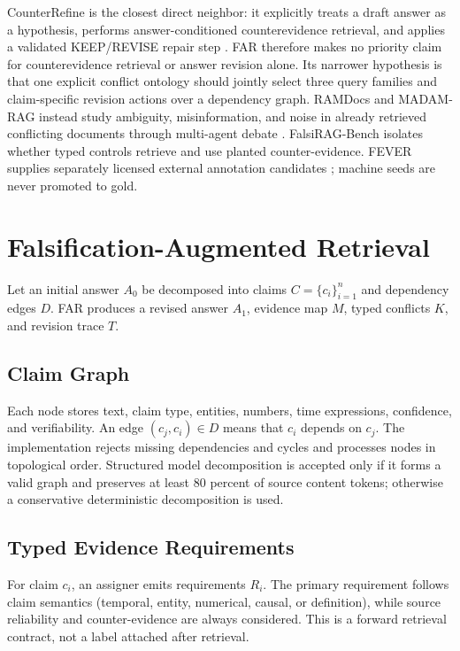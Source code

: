 \documentclass[letterpaper]{article}
\begin{document}
CounterRefine is the closest direct neighbor: it explicitly treats a draft answer as a hypothesis, performs answer-conditioned counterevidence retrieval, and applies a validated KEEP/REVISE repair step \cite{huang2026counterrefine}. FAR therefore makes no priority claim for counterevidence retrieval or answer revision alone. Its narrower hypothesis is that one explicit conflict ontology should jointly select three query families and claim-specific revision actions over a dependency graph. RAMDocs and MADAM-RAG instead study ambiguity, misinformation, and noise in already retrieved conflicting documents through multi-agent debate \cite{wang2025conflicting}. FalsiRAG-Bench isolates whether typed controls retrieve and use planted counter-evidence. FEVER supplies separately licensed external annotation candidates \cite{thorne2018fever}; machine seeds are never promoted to gold.

\section{Falsification-Augmented Retrieval}
Let an initial answer $A_0$ be decomposed into claims $C=\{c_i\}_{i=1}^{n}$ and dependency edges $D$. FAR produces a revised answer $A_1$, evidence map $M$, typed conflicts $K$, and revision trace $T$.

\subsection{Claim Graph}
Each node stores text, claim type, entities, numbers, time expressions, confidence, and verifiability. An edge $(c_j,c_i)\in D$ means that $c_i$ depends on $c_j$. The implementation rejects missing dependencies and cycles and processes nodes in topological order. Structured model decomposition is accepted only if it forms a valid graph and preserves at least 80 percent of source content tokens; otherwise a conservative deterministic decomposition is used.

\subsection{Typed Evidence Requirements}
For claim $c_i$, an assigner emits requirements $R_i$. The primary requirement follows claim semantics (temporal, entity, numerical, causal, or definition), while source reliability and counter-evidence are always considered. This is a forward retrieval contract, not a label attached after retrieval.
\end{document}
